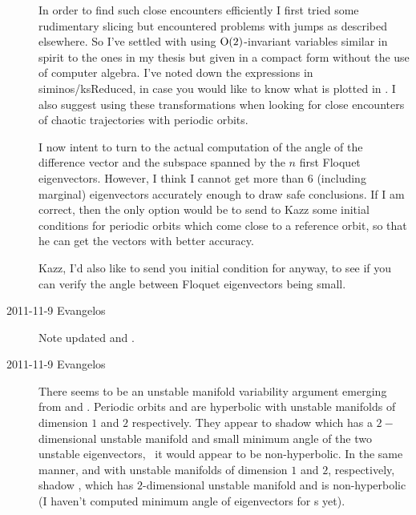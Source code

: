\begin{description}
  In order to find such close encounters efficiently I first tried some
  rudimentary slicing but encountered problems with jumps as described
  elsewhere. So I've settled with using $\textrm{O}(2)$-invariant
  variables similar in spirit to the ones in my thesis
  but given in a compact form without the use of computer algebra. I've noted
  down the expressions in siminos/ksReduced, in case you would like to know what
  is plotted in . I also suggest using these transformations
  when looking for close encounters of chaotic trajectories with periodic orbits.

  I now intent to turn to the actual computation of the angle of the difference
  vector and the subspace spanned by the $n$ first Floquet eigenvectors. However,
  I think I cannot get more than 6 (including marginal) eigenvectors accurately
  enough to draw safe conclusions. If I am correct, then the only option would be
  to send to Kazz some initial conditions for periodic orbits which come close
  to a reference orbit, so that he can get the vectors with better accuracy.

  Kazz, I'd also like to send you initial condition for  anyway, to
  see if you can verify the angle between Floquet eigenvectors being small.


\item[2011-11-9 Evangelos] Note updated  and .

\item[2011-11-9 Evangelos] There seems to be an unstable manifold variability argument
  emerging from  and . Periodic orbits
   and  are hyperbolic with unstable manifolds of dimension $1$ and $2$
  respectively. They appear to shadow  which has a $2-$dimensional unstable manifold
  and small minimum angle of the two unstable eigenvectors, \ie\ it would appear
  to be non-hyperbolic. In the same manner,  and  with unstable manifolds
  of dimension $1$ and $2$, respectively, shadow , which has $2$-dimensional
  unstable manifold and is non-hyperbolic (I haven't computed minimum angle of eigenvectors
  for \rpo s yet).


\end{description}
